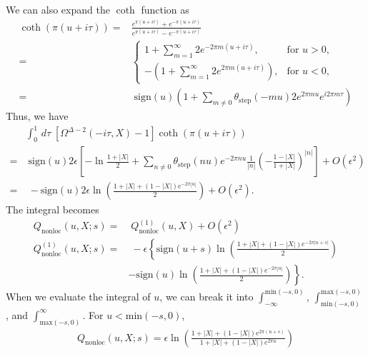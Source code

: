 \documentclass[a4paper,11pt]{article}
\theoremstyle{definition}
\theoremstyle{remark}
\begin{document}
We can also expand the $\coth$ function as
\begin{align}
    \coth(\pi (u+i\tau)) =& \frac{e^{\pi (u+i\tau)}+e^{-\pi (u+i\tau)}}{e^{\pi (u+i\tau)}-e^{-\pi (u+i\tau)}} \nonumber\\
    =& \begin{cases}
        1+\sum_{m=1}^{\infty} 2e^{-2\pi m (u+i\tau)}, & \text{for } u > 0,\\
        -(1+\sum_{m=1}^{\infty} 2e^{2\pi m (u+i\tau)}), & \text{for } u < 0,
    \end{cases}\\
    =& \;\text{sign}(u) \left(1+ \sum_{m \neq 0 } \theta_{\text{step}}(-mu)2 e^{2\pi m u} e^{i2\pi m \tau}\right)
\end{align}
Thus, we have
\begin{align}
    &\int_0^1 \, d\tau \; \left[\Omega^{\Delta-2}(-i\tau,X) -1\right] \coth(\pi(u+i\tau)) \nonumber\\
    =&\; \text{sign}(u)2\epsilon\left[-\ln\frac{1+|X|}{2}+\sum_{n\neq0} \theta_{\text{step}}(nu) e^{-2\pi n u} \frac{1}{|n|}\left(-\frac{1-|X|}{1+|X|}\right)^{|n|} \right] +O(\epsilon^2)\\
    =&\; -\text{sign}(u)2\epsilon \ln\left(\frac{1+|X| +(1-|X|)e^{-2\pi|u|}}{2}\right) +O(\epsilon^2).
\end{align}
The integral becomes
\begin{align}
    Q_{\text{nonloc}}(u,X;s) =&\; Q^{(1)}_{\text{nonloc}}(u,X) + O(\epsilon^2)\\
    Q^{(1)}_{\text{nonloc}}(u,X;s) =&\; -\epsilon\left\{ \text{sign}(u+s)\ln\left(\frac{1+|X| +(1-|X|)e^{-2\pi|u+s|}}{2}\right) \right. \nonumber\\
    & \left.- \text{sign}(u)\ln\left(\frac{1+|X| +(1-|X|)e^{-2\pi|u|}}{2}\right) \right\}.
\end{align}
When we evaluate the integral of $u$, we can break it into $\int_{-\infty}^{\text{min}(-s,0)}$, $\int_{\text{min}(-s,0)}^{\text{max}(-s,0)}$, and $\int_{\text{max}(-s,0)}^{\infty}$. For $u<\text{min}(-s,0)$, 
\begin{gather}
    Q_{\text{nonloc}}(u,X;s) = \epsilon\ln\left( \frac{1+|X| +(1-|X|)e^{2\pi(u+s)}}{1+|X| +(1-|X|)e^{2\pi u}}\right)
\end{gather}
\end{document}
